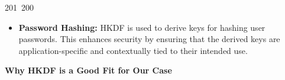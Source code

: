 201~200~\documentclass{article}
\begin{document}
\begin{itemize}
	                                                                                                                                                                                                                                                                                                	                                                                                                                                        	    	                                                                                                	                                                                                                                                                                                                                                                            \item \textbf{Password Hashing:} HKDF is used to derive keys for hashing user passwords. This enhances security by ensuring that the derived keys are application-specific and contextually tied to their intended use.
	                                                                                                                                                                                                                                                                                                	                                                                                                                                        	    	                                                                                                	                                                                                                                                                                                                                                                            \end{itemize}

	                                                                                                                                                                                                                                                                                                	                                                                                                                                        	    	                                                                                                	                                                                                                                                                                                                                                                            \textbf{Why HKDF is a Good Fit for Our Case}
\end{document}
